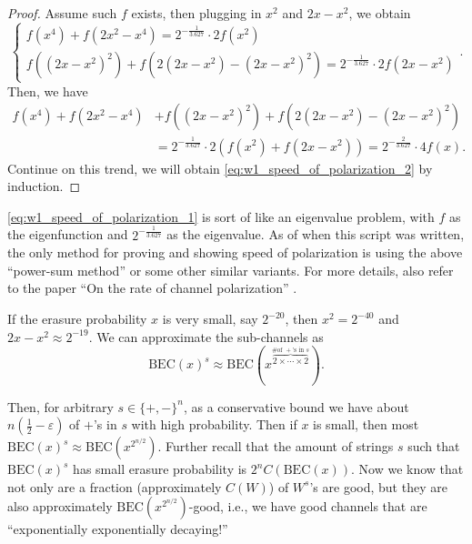 \begin{proof}
    Assume such $f$ exists, then plugging in $x^2$ and $2x-x^2$, we obtain
    \begin{equation*}
    \begin{cases}
        f(x^4) + f(2x^2-x^4) = 2^{-\frac{1}{3.627}}\cdot 2 f(x^2) \\
        f((2x-x^2)^2) + f(2(2x-x^2)-(2x-x^2)^2) = 2^{-\frac{1}{3.627}}\cdot 2 f(2x-x^2)
    \end{cases}.
    \end{equation*}
    Then, we have
    \begin{align*}
        f(x^4) + f(2x^2-x^4) &+ f((2x-x^2)^2) + f(2(2x-x^2)-(2x-x^2)^2) \\
        &= 2^{-\frac{1}{3.627}}\cdot2\left(f(x^2) + f(2x-x^2)\right) = 2^{-\frac{2}{3.627}}\cdot 4f(x).
    \end{align*}
    Continue on this trend, we will obtain \autoref{eq:w1_speed_of_polarization_2} by induction.
\end{proof}
\autoref{eq:w1_speed_of_polarization_1} is sort of like an eigenvalue problem, with $f$ as the eigenfunction and $2^{-\frac{1}{3.627}}$ as the eigenvalue. As of when this script was written, the only method for proving and showing speed of polarization is using the above ``power-sum method'' or some other similar variants. For more details, also refer to the paper ``On the rate of channel polarization'' \cite{On_the_Rate_of_Channel_Polarization}.

If the erasure probability $x$ is very small, say $2^{-20}$, then $x^2 = 2^{-40}$ and $2x - x^2 \approx 2^{-19}$. We can approximate the sub-channels as
\begin{equation}
    \mathrm{BEC}(x)^s \approx \mathrm{BEC}(x^{\overbrace{2\times\cdots\times 2}^{\text{\# of $+$'s in $s$}}}).
\end{equation}

Then, for arbitrary $s\in\{+,-\}^n$, as a conservative bound we have about $n(\frac{1}{2}-\varepsilon)$ of $+$'s in $s$ with high probability. Then if $x$ is small, then most $\mathrm{BEC}(x)^s \approx \mathrm{BEC}(x^{2^{n/2}})$. Further recall that the amount of strings $s$ such that $\mathrm{BEC}(x)^s$ has small erasure probability is $2^n C\left(\mathrm{BEC}(x)\right)$. Now we know that not only are a fraction (approximately $C(W)$) of $W^s$'s are good, but they are also approximately $\mathrm{BEC}(x^{2^{n/2}})$-good, i.e., we have good channels that are ``exponentially exponentially decaying!''


